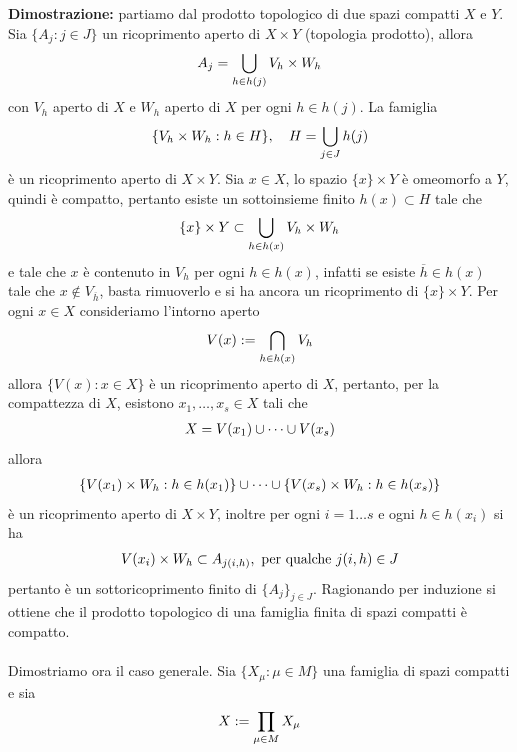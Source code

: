 \documentclass{article}
\begin{document}
\textbf{Dimostrazione:} partiamo dal prodotto topologico di due spazi compatti $X$ e $Y$. Sia $\{ A_j : j \in J \}$ un ricoprimento aperto di $X \times Y$ (topologia prodotto), allora
\begin{gather}
    A_j = \bigcup_{h \in h(j)} V_h \times W_h \notag
\end{gather}
con $V_h$ aperto di $X$ e $W_h$ aperto di $X$ per ogni $h \in h(j)$. La famiglia
\begin{gather}
    \{ V_h \times W_h : h \in H \}, \quad H = \bigcup_{j \in J} h(j) \notag
\end{gather}
è un ricoprimento aperto di $X \times Y$. Sia $x \in X$, lo spazio $\{ x \} \times Y$ è omeomorfo a $Y$, quindi è compatto, pertanto esiste un sottoinsieme finito $h(x) \subset H$ tale che
\begin{gather}
    \{ x \} \times Y \subset \bigcup_{h \in h(x)} V_h \times W_h \notag
\end{gather}
e tale che $x$ è contenuto in $V_h$ per ogni $h \in h(x)$, infatti se esiste $\overline{h} \in h(x)$ tale che $x \not\in V_{\overline{h}}$, basta rimuoverlo e si ha ancora un ricoprimento di $\{ x \} \times Y$. Per ogni $x \in X$ consideriamo l'intorno aperto
\begin{gather}
    V(x) := \bigcap_{h \in h(x)} V_h \notag
\end{gather}
allora $\{ V(x) : x \in X \}$ è un ricoprimento aperto di $X$, pertanto, per la compattezza di $X$, esistono $x_1, \dots, x_s \in X$ tali che
\begin{gather}
    X = V(x_1) \cup \dots \cup V(x_s) \notag
\end{gather}
allora
\begin{gather}
    \{ V(x_1) \times W_h : h \in h(x_1) \} \cup \dots \cup \{ V(x_s) \times W_h : h \in h(x_s) \} \notag
\end{gather}
è un ricoprimento aperto di $X \times Y$, inoltre per ogni $i = 1 \dots s$ e ogni $h \in h(x_i)$ si ha
\begin{gather}
    V(x_i) \times W_h \subset A_{j(i, h)}, \text{ per qualche } j(i, h) \in J \notag
\end{gather}
pertanto è un sottoricoprimento finito di $\{ A_j \}_{j \in J}$. Ragionando per induzione si ottiene che il prodotto topologico di una famiglia finita di spazi compatti è compatto. \\ \\
Dimostriamo ora il caso generale. Sia $\{ X_\mu : \mu \in M \}$ una famiglia di spazi compatti e sia
\begin{gather}
    X := \prod_{\mu \in M} X_\mu \notag
\end{gather}
\end{document}
